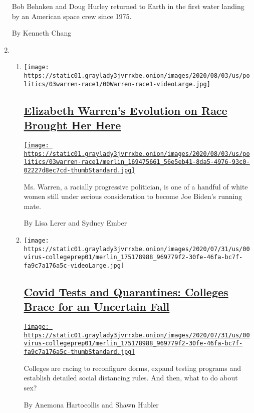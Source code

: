\begin{enumerate}
  Bob Behnken and Doug Hurley returned to Earth in the first water
  landing by an American space crew since 1975.

  By Kenneth Chang
\item
  \begin{enumerate}
  \def\labelenumii{\arabic{enumii}.}
  \item
    \texttt{[image: https://static01.graylady3jvrrxbe.onion/images/2020/08/03/us/politics/03warren-race1/00Warren-race1-videoLarge.jpg]}

    \hypertarget{elizabeth-warrens-evolution-on-race-brought-her-here}{%
    \subsection{\texorpdfstring{\href{/2020/08/02/us/politics/elizabeth-warren-biden-vice-president.html}{Elizabeth
    Warren's Evolution on Race Brought Her
    Here}}{Elizabeth Warren's Evolution on Race Brought Her Here}}\label{elizabeth-warrens-evolution-on-race-brought-her-here}}

    \href{/2020/08/02/us/politics/elizabeth-warren-biden-vice-president.html}{\texttt{[image: https://static01.graylady3jvrrxbe.onion/images/2020/08/03/us/politics/03warren-race1/merlin\_169475661\_56e5eb41-8da5-4976-93c0-02227d8ec7cd-thumbStandard.jpg]}}

    Ms. Warren, a racially progressive politician, is one of a handful
    of white women still under serious consideration to become Joe
    Biden's running mate.

    By Lisa Lerer and Sydney Ember
  \item
    \texttt{[image: https://static01.graylady3jvrrxbe.onion/images/2020/07/31/us/00virus-collegeprep01/merlin\_175178988\_969779f2-30fe-46fa-bc7f-fa9c7a176a5c-videoLarge.jpg]}

    \hypertarget{covid-tests-and-quarantines-colleges-brace-for-an-uncertain-fall}{%
    \subsection{\texorpdfstring{\href{/2020/08/02/us/covid-college-reopening.html}{Covid
    Tests and Quarantines: Colleges Brace for an Uncertain
    Fall}}{Covid Tests and Quarantines: Colleges Brace for an Uncertain Fall}}\label{covid-tests-and-quarantines-colleges-brace-for-an-uncertain-fall}}

    \href{/2020/08/02/us/covid-college-reopening.html}{\texttt{[image: https://static01.graylady3jvrrxbe.onion/images/2020/07/31/us/00virus-collegeprep01/merlin\_175178988\_969779f2-30fe-46fa-bc7f-fa9c7a176a5c-thumbStandard.jpg]}}

    Colleges are racing to reconfigure dorms, expand testing programs
    and establish detailed social distancing rules. And then, what to do
    about sex?

    By Anemona Hartocollis and Shawn Hubler
  \end{enumerate}
\end{enumerate}

